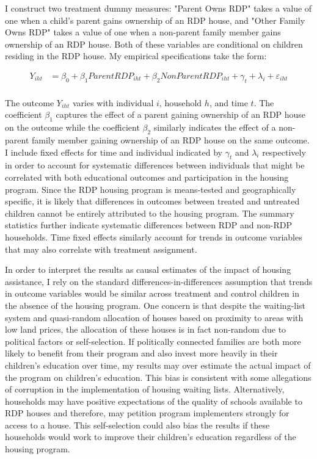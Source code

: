 \documentclass[11pt]{article} %
\begin{document}
I construct two treatment dummy measures: "Parent Owns RDP" takes a value of one when a child's parent gains ownership of an RDP house, and "Other Family Owns RDP" takes a value of one when a non-parent family member gains ownership of an RDP house.  Both of these variables are conditional on children residing in the RDP house.  My empirical specifications take the form:

\begin{align*}
Y_{iht}  &= \beta_0 + \beta_1 ParentRDP_{iht} + \beta_2 NonParentRDP_{iht} + \gamma_t + \lambda_i + \varepsilon_{iht} \\
\end{align*}

The outcome $Y_{iht}$ varies with individual $i$, household $h$, and time $t$.  The coefficient $\beta_1$ captures the effect of a parent gaining ownership of an RDP house on the outcome while the coefficient $\beta_2$ similarly indicates the effect of a non-parent family member gaining ownership of an RDP house on the same outcome.  I include fixed effects for time and individual indicated by $\gamma_t$ and $\lambda_i$ respectively in order to account for systematic differences between individuals that might be correlated with both educational outcomes and participation in the housing program.  Since the RDP housing program is means-tested and geographically specific, it is likely that differences in outcomes between treated and untreated children cannot be entirely attributed to the housing program.  The summary statistics further indicate systematic differences between RDP and non-RDP households.  Time fixed effects similarly account for trends in outcome variables that may also correlate with treatment assignment.

In order to interpret the results as causal estimates of the impact of housing assistance, I rely on the standard differences-in-differences assumption that trends in outcome variables would be similar across treatment and control children in the absence of the housing program.  One concern is that despite the waiting-list system and quasi-random allocation of houses based on proximity to areas with low land prices, the allocation of these houses is in fact non-random due to political factors or self-selection.  If politically connected families are both more likely to benefit from their program and also invest more heavily in their children's education over time, my results may over estimate the actual impact of the program on children's education.  This bias is consistent with some allegations of corruption in the implementation of housing waiting lists.  Alternatively, households may have positive expectations of the quality of schools available to RDP houses and therefore, may petition program implementers strongly for access to a house.  This self-selection could also bias the results if these households would work to improve their children's education regardless of the housing program.
\end{document}
